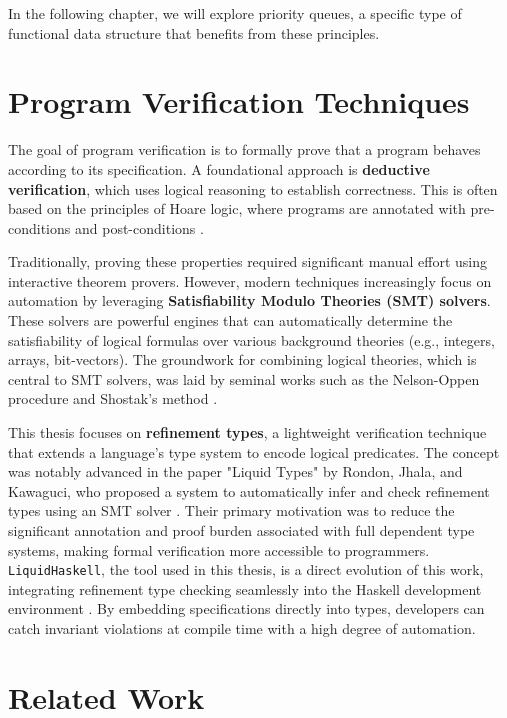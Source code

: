 In the following chapter, we will explore priority queues, a specific type of functional data structure that benefits from these principles.
\section{Program Verification Techniques}

The goal of program verification is to formally prove that a program behaves according to its specification.
A foundational approach is \textbf{deductive verification}, which uses logical reasoning to establish correctness.
This is often based on the principles of Hoare logic, where programs are annotated with pre-conditions and post-conditions \cite{Hoare69}.

Traditionally, proving these properties required significant manual effort using interactive theorem provers.
However, modern techniques increasingly focus on automation by leveraging \textbf{Satisfiability Modulo Theories (SMT) solvers}.
These solvers are powerful engines that can automatically determine the satisfiability of logical formulas over various background theories (e.g., integers, arrays, bit-vectors).
The groundwork for combining logical theories, which is central to SMT solvers, was laid by seminal works such as the Nelson-Oppen procedure \cite{Nelson79} and Shostak's method \cite{Shostak84}.

This thesis focuses on \textbf{refinement types}, a lightweight verification technique that extends a language's type system to encode logical predicates.
The concept was notably advanced in the paper "Liquid Types" by Rondon, Jhala, and Kawaguci, who proposed a system to automatically infer and check refinement types using an SMT solver \cite{rondonLiquidTypes2008}.
Their primary motivation was to reduce the significant annotation and proof burden associated with full dependent type systems, making formal verification more accessible to programmers.
\texttt{LiquidHaskell}, the tool used in this thesis, is a direct evolution of this work, integrating refinement type checking seamlessly into the Haskell development environment \cite{vazou2014}.
By embedding specifications directly into types, developers can catch invariant violations at compile time with a high degree of automation.

\section{Related Work}

